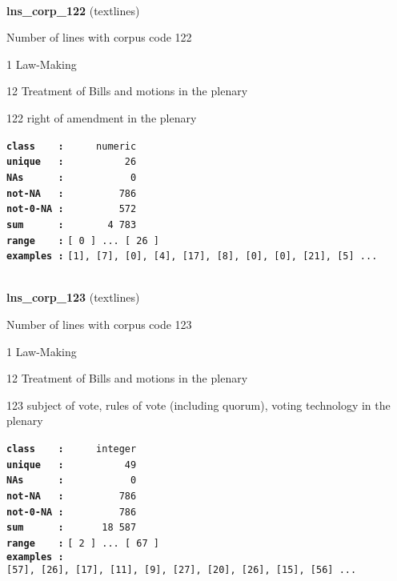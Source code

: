 \documentclass[]{article}
\begin{document}
~

\textbf{lns\_corp\_122} (textlines)

Number of lines with corpus code 122

1 Law-Making

12 Treatment of Bills and motions in the plenary

122 right of amendment in the plenary

\textbf{\texttt{class\ \ \ \ :}} \texttt{~~~~~numeric}\\
\textbf{\texttt{unique\ \ \ :}} \texttt{~~~~~~~~~~26}\\
\textbf{\texttt{NAs\ \ \ \ \ \ :}} \texttt{~~~~~~~~~~~0}\\
\textbf{\texttt{not-NA\ \ \ :}} \texttt{~~~~~~~~~786}\\
\textbf{\texttt{not-0-NA\ :}} \texttt{~~~~~~~~~572}\\
\textbf{\texttt{sum\ \ \ \ \ \ :}} \texttt{~~~~~~~4~783}\\
\textbf{\texttt{range\ \ \ \ :}}
\texttt{{[}\ 0\ {]}\ ...\ {[}\ 26\ {]}}\\
\textbf{\texttt{examples\ :}}
\texttt{{[}1{]},\ {[}7{]},\ {[}0{]},\ {[}4{]},\ {[}17{]},\ {[}8{]},\ {[}0{]},\ {[}0{]},\ {[}21{]},\ {[}5{]}\ ...}\\

~

\textbf{lns\_corp\_123} (textlines)

Number of lines with corpus code 123

1 Law-Making

12 Treatment of Bills and motions in the plenary

123 subject of vote, rules of vote (including quorum), voting technology
in the plenary

\textbf{\texttt{class\ \ \ \ :}} \texttt{~~~~~integer}\\
\textbf{\texttt{unique\ \ \ :}} \texttt{~~~~~~~~~~49}\\
\textbf{\texttt{NAs\ \ \ \ \ \ :}} \texttt{~~~~~~~~~~~0}\\
\textbf{\texttt{not-NA\ \ \ :}} \texttt{~~~~~~~~~786}\\
\textbf{\texttt{not-0-NA\ :}} \texttt{~~~~~~~~~786}\\
\textbf{\texttt{sum\ \ \ \ \ \ :}} \texttt{~~~~~~18~587}\\
\textbf{\texttt{range\ \ \ \ :}}
\texttt{{[}\ 2\ {]}\ ...\ {[}\ 67\ {]}}\\
\textbf{\texttt{examples\ :}}
\texttt{{[}57{]},\ {[}26{]},\ {[}17{]},\ {[}11{]},\ {[}9{]},\ {[}27{]},\ {[}20{]},\ {[}26{]},\ {[}15{]},\ {[}56{]}\ ...}\\
\end{document}
